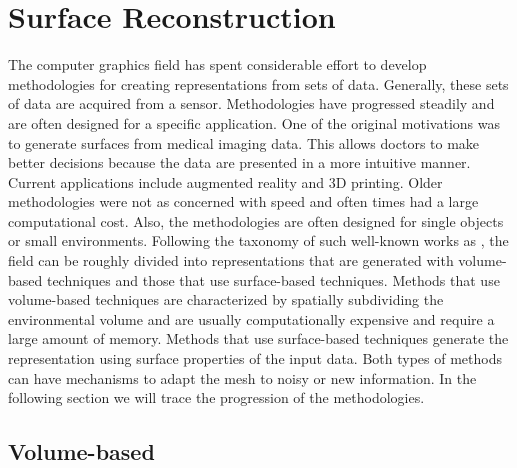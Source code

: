 \section{Surface Reconstruction}

The computer graphics field has spent considerable effort to develop methodologies
for creating representations from sets of data. Generally, these sets of
data are acquired from a sensor. Methodologies have progressed steadily and
are often designed for a specific application. One of the original motivations
was to generate surfaces from medical imaging data. This
allows doctors to make better decisions because the data are presented in a
more intuitive manner. Current applications include augmented reality and
3D printing. Older methodologies were not as concerned with speed and often
times had a large computational cost. Also, the methodologies are often
designed for single objects or small environments. Following the taxonomy
of such well-known works as \cite{Gopi2002,Mencl1997}, the field can be
roughly divided into representations that are generated with volume-based
techniques and those that use surface-based techniques. Methods that use
volume-based techniques are characterized by spatially subdividing the
environmental volume and are usually computationally expensive and require
a large amount of memory. Methods that use surface-based techniques
generate the representation using surface properties of the input data.
Both types of methods can have mechanisms to adapt the mesh to noisy or new
information.  In the following section we will trace the progression of the
methodologies.

\subsection{Volume-based}

